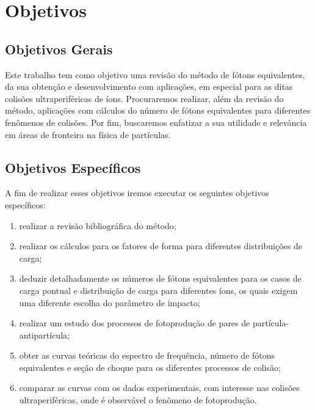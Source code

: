 \chapter{Objetivos}

\section{Objetivos Gerais}
Este trabalho tem como objetivo uma revisão do método de fótons equivalentes,
da sua obtenção e desenvolvimento com aplicações, em especial para as ditas
colisões ultraperiféricas de íons. Procuraremos realizar, além da
revisão do método, aplicações com cálculos do número de fótons equivalentes
para diferentes fenômenos de colisões. Por fim, buscaremos enfatizar a sua
utilidade e relevância em áreas de fronteira na física de partículas.


\section{Objetivos Específicos}
A fim de realizar esses objetivos iremos executar os seguintes objetivos
específicos:
\begin{enumerate}
\item realizar a revisão bibliográfica do método;
\item realizar os cálculos para os fatores de forma para diferentes distribuições
	de carga;
\item deduzir detalhadamente os números de fótons equivalentes para os casos de
	carga pontual e distribuição de carga para diferentes íons, os quais exigem
	uma diferente escolha do parâmetro de impacto;
\item realizar um estudo dos processos de fotoprodução de pares de
	partícula-antipartícula; 
\item obter as curvas teóricas do espectro de frequência, número de fótons
equivalentes e seção de choque para os diferentes processos de colisão;
\item comparar as curvas com os dados experimentais, com interesse nas
colisões ultraperiféricas, onde é observável o fenômeno de fotoprodução.
\end{enumerate}

